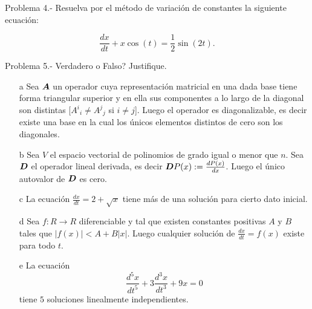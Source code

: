 \documentclass{article}
\newcommand{\ve}[1]{\mbox{\boldmath ${#1}$}}
\begin{document}
Problema 4.-
%
Resuelva por el m\'etodo de variaci\'on de constantes la siguiente 
ecuaci\'on:

\begin{equation}
\frac{dx}{dt} + x \cos(t) = \frac{1}{2} \sin(2t).
\end{equation}






Problema 5.-
Verdadero o Falso? Justifique.

\begin{itemize}

\item[a] Sea $\ve{A}$ un operador cuya representaci\'on matricial en una dada base tiene forma triangular superior y en ella sus componentes a lo largo de la
diagonal son distintas [$A^i{}_i \neq A^j{}_j $ si $i\neq j$]. Luego el operador es 
diagonalizable, es decir existe una base en la cual los \'unicos elementos
distintos de cero son los diagonales.

\item[b] Sea $V$ el espacio vectorial de polinomios de grado igual o menor
que $n$. Sea $\ve{D}$ el operador lineal derivada, es decir 
$\ve{D} P(x) := \frac{dP(x)}{dx}$. Luego el \'unico autovalor de $\ve{D}$ es cero.

\item[c] La ecuaci\'on $\frac{dx}{dt} = 2 + \sqrt{x}$ tiene m\'as de una soluci\'on para cierto dato inicial.

\item[d] Sea $f: R \to R$ diferenciable y tal que existen constantes
positivas $A$ y $B$ tales que $|f(x)| < A + B|x|$. Luego cualquier soluci\'on
de $\frac{dx}{dt} = f(x)$ existe para todo $t$.

\item[e] La ecuaci\'on 
\begin{equation}
\frac{d^5x}{dt^5} + 3 \frac{d^3x}{dt^3} + 9x =0
\end{equation}
tiene $5$ soluciones linealmente independientes.

\end{itemize}
\end{document}
